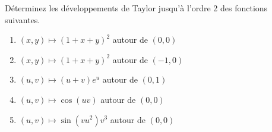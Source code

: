 
\begin{exercice}\label{exoDevel0007}

Déterminez les développements de Taylor jusqu'à l'ordre 2 des fonctions suivantes.
\begin{enumerate}
	\item $ (x,y) \mapsto (1+x+y)^2$ autour de $(0,0)$
	\item $ (x,y) \mapsto (1+x+y)^2$ autour de $(-1,0)$
	\item $ (u,v) \mapsto (u+v)e^u$ autour de $(0,1)$
	\item $ (u,v) \mapsto \cos(uv)$ autour de $(0,0)$
	\item $ (u,v) \mapsto \sin(vu^2)v^3$ autour de $(0,0)$
\end{enumerate}

\end{exercice}
